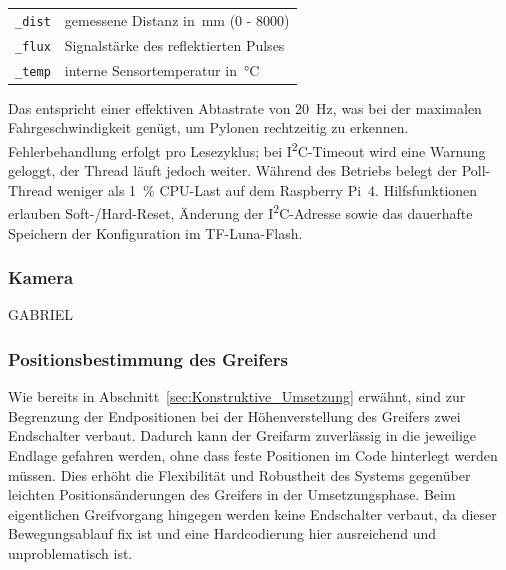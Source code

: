 \documentclass[main.tex]{subfiles} %
\begin{document}
\begin{center}
  \begin{tabular}{@{}ll@{}}
    \texttt{\_dist} & gemessene Distanz in~\si{mm} (0 - 8000)\\
    \texttt{\_flux} & Signalstärke des reflektierten Pulses\\
    \texttt{\_temp} & interne Sensortemperatur in~\si{\celsius}
  \end{tabular}
\end{center}

Das entspricht einer effektiven Abtastrate von \SI{20}{Hz}, was bei der
maximalen Fahrgeschwindigkeit genügt, um Pylonen rechtzeitig zu erkennen.
Fehlerbehandlung erfolgt pro Lesezyklus; bei I\textsuperscript{2}C-Timeout
wird eine Warnung geloggt, der Thread läuft jedoch weiter.
Während des Betriebs belegt der Poll-Thread weniger als
\SI{1}{\percent} CPU-Last auf dem Raspberry Pi~4.
Hilfsfunktionen erlauben Soft-/Hard-Reset, Änderung der
I\textsuperscript{2}C-Adresse
sowie das dauerhafte Speichern der Konfiguration im TF-Luna-Flash.

\subsubsection*{Kamera}

GABRIEL

\subsubsection*{Positionsbestimmung des Greifers}
Wie bereits in Abschnitt~\ref{sec:Konstruktive_Umsetzung} erwähnt, sind zur Begrenzung der Endpositionen bei der
Höhenverstellung des Greifers zwei Endschalter verbaut. Dadurch kann der Greifarm zuverlässig in die jeweilige Endlage
gefahren werden, ohne dass feste Positionen im Code hinterlegt werden müssen. Dies erhöht die Flexibilität und Robustheit
des Systems gegenüber leichten Positionsänderungen des Greifers in der Umsetzungsphase. Beim eigentlichen Greifvorgang hingegen werden keine Endschalter
verbaut, da dieser Bewegungsablauf fix ist und eine Hardcodierung hier ausreichend und unproblematisch ist.
\end{document}
